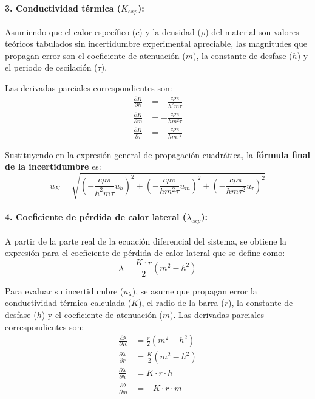 \documentclass[a4paper,11pt]{article}
\begin{document}
\paragraph{3. Conductividad térmica ($K_{exp}$):}

Asumiendo que el calor específico ($c$) y la densidad ($\rho$) del material son valores teóricos tabulados sin incertidumbre experimental apreciable, las magnitudes que propagan error son el coeficiente de atenuación ($m$), la constante de desfase ($h$) y el periodo de oscilación ($\tau$). 

Las derivadas parciales correspondientes son:
\begin{align}
    \frac{\partial K}{\partial h} &= -\frac{c \rho \pi}{h^2 m \tau} \\
    \frac{\partial K}{\partial m} &= -\frac{c \rho \pi}{h m^2 \tau} \\
    \frac{\partial K}{\partial \tau} &= -\frac{c \rho \pi}{h m \tau^2}
\end{align}

Sustituyendo en la expresión general de propagación cuadrática, la \textbf{fórmula final de la incertidumbre} es:
\begin{equation}
    u_K = \sqrt{ \left( -\frac{c \rho \pi}{h^2 m \tau} u_h \right)^2 + \left( -\frac{c \rho \pi}{h m^2 \tau} u_m \right)^2 + \left( -\frac{c \rho \pi}{h m \tau^2} u_\tau \right)^2 }
\end{equation}

\paragraph{4. Coeficiente de pérdida de calor lateral ($\lambda_{exp}$):}
A partir de la parte real de la ecuación diferencial del sistema, se obtiene la expresión para el coeficiente de pérdida de calor lateral que se define como:
\begin{equation}
    \lambda = \frac{K \cdot r}{2} (m^2 - h^2)
\end{equation}

Para evaluar su incertidumbre ($u_\lambda$), se asume que propagan error la conductividad térmica calculada ($K$), el radio de la barra ($r$), la constante de desfase ($h$) y el coeficiente de atenuación ($m$). Las derivadas parciales correspondientes son:
\begin{align}
    \frac{\partial \lambda}{\partial K} &= \frac{r}{2} (m^2 - h^2) \\
    \frac{\partial \lambda}{\partial r} &= \frac{K}{2} (m^2 - h^2) \\
    \frac{\partial \lambda}{\partial h} &= K \cdot r \cdot h \\
    \frac{\partial \lambda}{\partial m} &= - K \cdot r \cdot m
\end{align}
\end{document}
